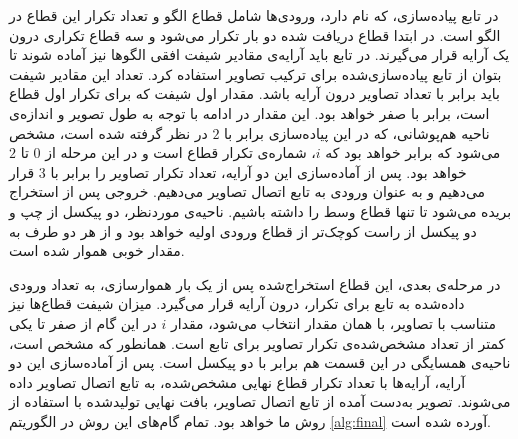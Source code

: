 در تابع پیاده‌سازی، که  نام دارد، ورودی‌ها شامل قطاع الگو و تعداد تکرار این قطاع در الگو است. در ابتدا قطاع دریافت شده دو بار تکرار می‌شود و سه قطاع تکراری درون یک آرایه قرار می‌گیرند. در تابع باید آرایه‌ی مقادیر شیفت افقی الگو‌ها نیز آماده شوند تا بتوان از تابع پیاده‌سازی‌شده برای ترکیب تصاویر استفاده کرد. تعداد این مقادیر شیفت باید برابر با تعداد تصاویر درون آرایه باشد. مقدار اول شیفت که برای تکرار اول قطاع است، برابر با صفر خواهد بود. این مقدار در ادامه با توجه به طول تصویر و اندازه‌ی ناحیه هم‌پوشانی، که در این پیاده‌سازی برابر با $2$ در نظر گرفته شده است، مشخص می‌شود که برابر 
خواهد بود که $i$، شماره‌ی تکرار قطاع است و در این مرحله از $0$ تا $2$ خواهد بود. پس از آماده‌سازی این دو آرایه، تعداد تکرار تصاویر را برابر با $3$ قرار می‌دهیم و به عنوان ورودی به تابع اتصال تصاویر می‌دهیم. خروجی پس از استخراج بریده می‌شود تا تنها قطاع وسط را داشته باشیم. ناحیه‌ی موردنظر، دو پیکسل از چپ و دو پیکسل از راست کوچک‌تر از قطاع ورودی اولیه خواهد بود و از هر دو طرف به مقدار خوبی هموار شده است.

در مرحله‌ی بعدی، این قطاع استخراج‌شده پس از یک بار هموار‌سازی، به تعداد ورودی داده‌شده به تابع برای تکرار، درون آرایه قرار می‌گیرد. میزان شیفت قطاع‌ها نیز متناسب با تصاویر، با همان مقدار 
انتخاب می‌شود، مقدار $i$ در این گام از صفر تا یکی کمتر از تعداد مشخص‌شده‌ی تکرار تصاویر برای تابع است. همانطور که مشخص است، ناحیه‌ی همسایگی در این قسمت هم برابر با دو پیکسل است. پس از آماده‌سازی این دو آرایه، آرایه‌ها با تعداد تکرار قطاع نهایی مشخص‌شده، به تابع اتصال تصاویر داده می‌شوند. تصویر به‌دست آمده از تابع اتصال تصاویر، بافت نهایی تولید‌شده با استفاده از روش ما خواهد بود. تمام گام‌های این روش در الگوریتم \ref{alg:final} آورده شده است.
